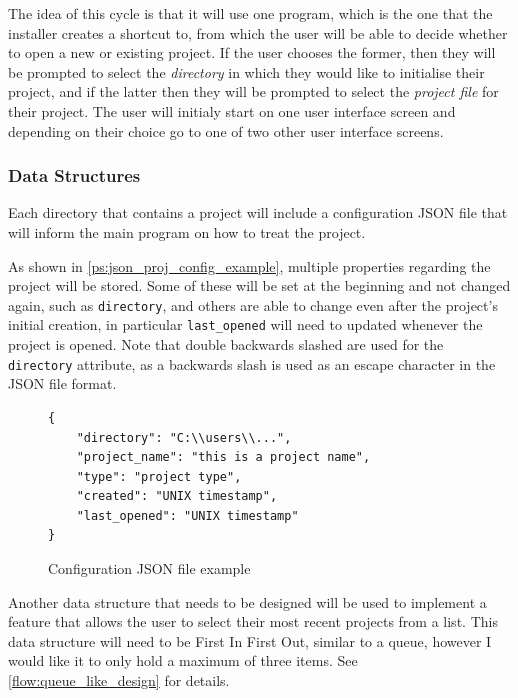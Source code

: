 \documentclass[11pt]{article}
\begin{document}
            The idea of this cycle is that it will use one program, which is the one that the installer creates a shortcut to, from which the user will be able to decide whether to open a new or existing project. If the user chooses the former, then they will be prompted to select the \textit{directory} in which they would like to initialise their project, and if the latter then they will be prompted to select the \textit{project file} for their project. 
            The user will initialy start on one user interface screen and depending on their choice go to one of two other user interface screens.

            \subsubsection{Data Structures}

                Each directory that contains a project will include a configuration JSON file that will inform the main program on how to treat the project.
                
                As shown in \autoref{ps:json_proj_config_example}, multiple properties regarding the project will be stored. Some of these will be set at the beginning and not changed again, such as \verb|directory|, and others are able to change even after the project's initial creation, in particular \verb|last_opened| will need to updated whenever the project is opened. Note that double backwards slashed are used for the \verb|directory| attribute, as a backwards slash is used as an escape character in the JSON file format.

                \begin{figure}[!ht]
                    \begin{verbatim}
{
    "directory": "C:\\users\\...",
    "project_name": "this is a project name",
    "type": "project type",
    "created": "UNIX timestamp",
    "last_opened": "UNIX timestamp"
}
                    \end{verbatim}
                    \caption{Configuration JSON file example}
                    \label{ps:json_proj_config_example}
                \end{figure}
                
                Another data structure that needs to be designed will be used to implement a feature that allows the user to select their most recent projects from a list. 
                This data structure will need to be First In First Out, similar to a queue, however I would like it to only hold a maximum of three items. 
                See \autoref{flow:queue_like_design} for details.
\end{document}

